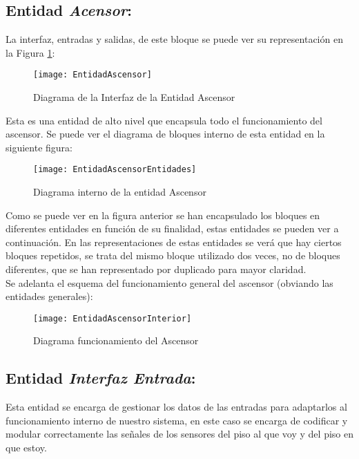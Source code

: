 \subsection{Entidad \textit{Acensor}:} \label{bloque:Ascensor}
    
    La interfaz, entradas y salidas, de este bloque se puede ver su representación en la Figura \ref{fig:EntidadIAscensor}:
    
    \begin{figure}[H]
		    \centering
		    \texttt{[image: EntidadAscensor]}
		    \caption{Diagrama de la Interfaz de la Entidad Ascensor}
		    \label{fig:EntidadIAscensor}
	\end{figure}
	
	Esta es una entidad de alto nivel que encapsula todo el funcionamiento del ascensor. Se puede ver el diagrama de bloques interno de esta entidad en la siguiente figura: 
	
	\begin{figure}[H]
		    \centering
		    \texttt{[image: EntidadAscensorEntidades]}
		    \caption{Diagrama interno de la entidad Ascensor}
		    \label{fig:EntidadIAscensorEntidades}
	\end{figure}
	
	Como se puede ver en la figura anterior se han encapsulado los bloques en diferentes entidades en función de su finalidad, estas entidades se pueden ver a continuación. En las representaciones de estas entidades se verá que hay ciertos bloques repetidos, se trata del mismo bloque utilizado dos veces, no de bloques diferentes, que se han representado por duplicado para mayor claridad. \\ 

	Se adelanta el esquema del funcionamiento general del ascensor (obviando las entidades generales):

	\begin{figure}[H]
		    \centering
		    \texttt{[image: EntidadAscensorInterior]}
		    \caption{Diagrama funcionamiento del Ascensor}
		    \label{fig:EntidadIAscensorInterior}
	\end{figure}

\subsection{Entidad \textit{Interfaz Entrada}:} \label{bloque:InterfazEntrada}
	Esta entidad se encarga de gestionar los datos de las entradas para adaptarlos al funcionamiento interno de nuestro sistema, en este caso se encarga de codificar y modular correctamente las señales de los sensores del piso al que voy y del piso en que estoy. \\ 

